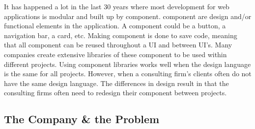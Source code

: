 It has happened a lot in the last 30 years where most development for web applications is modular and built up by \gls{component}. \Gls{component} are design and/or functional elements in the application. A component could be a button, a navigation bar, a card\cite{babichSimpleDesignTips2020}, etc. Making \gls{component} is done to save code, meaning that all \gls{component} can be reused throughout a UI and between UI's. Many companies create extensive libraries of these \gls{component} to be used within different projects. Using \gls{component} libraries works well when the design language is the same for all projects. However, when a consulting firm's clients often do not have the same design language. The differences in design result in that the consulting firms often need to redesign their \gls{component} between projects. 





\subsection{The Company \& the Problem}
\label{sub:company}




